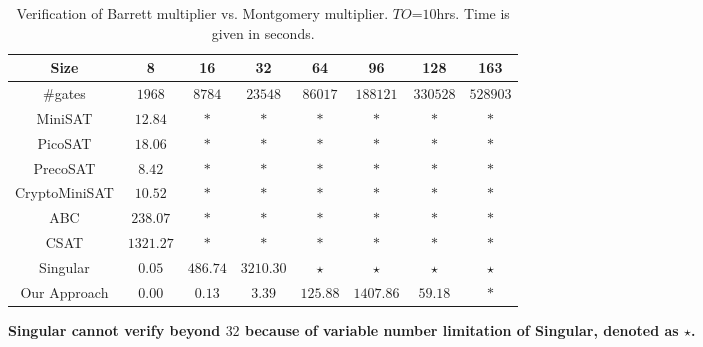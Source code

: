 \begin{table}[h!]
\begin{center}
\caption{\small Verification of Barrett multiplier vs. Montgomery multiplier. $TO$=$10$hrs. Time is given in seconds.}
\label{tab:bvsmont}
\begin{tabular}{|c||c|c|c|c|c|c|c|} \hline 
Size   			&8  		&16       	&32       	&64         &96   		&128		&163	\\
\hline 
\#gates 		&$1968$  	&$8784$    	&$23548$   	&$86017$    &$188121$  	&$330528$	&$528903$\\
\hline
MiniSAT   		&$12.84$  	&$\ast$   	&$\ast$  	&$\ast$    	&$\ast$ 	&$\ast$		&$\ast$ \\
\hline
PicoSAT   		&$18.06$  	&$\ast$   	&$\ast$  	&$\ast$    	&$\ast$ 	&$\ast$		&$\ast$ \\
\hline
PrecoSAT   		&$8.42$  	&$\ast$   	&$\ast$  	&$\ast$    	&$\ast$ 	&$\ast$		&$\ast$ \\
\hline
CryptoMiniSAT	&$10.52$  	&$\ast$   	&$\ast$  	&$\ast$    	&$\ast$ 	&$\ast$		&$\ast$ \\
\hline
ABC   			&$238.07$  	&$\ast$   	&$\ast$  	&$\ast$    	&$\ast$ 	&$\ast$		&$\ast$ \\
\hline
CSAT   			&$1321.27$  &$\ast$   	&$\ast$  	&$\ast$    	&$\ast$  	&$\ast$		&$\ast$ \\
\hline
Singular		&$0.05$  	&$486.74$   &$3210.30$  &$\star$   	&$\star$ 	&$\star$ 	&$\star$	\\
\hline
\hline
Our Approach   	&$0.00$  	&$0.13$   	&$3.39$  	&$125.88$  &$1407.86$  &$59.18$		&$\ast$ \\
\hline
\end{tabular}
\end{center}
\end{table}

{\bf Singular cannot verify beyond $32$  because of variable number limitation of Singular, denoted as $\star$.}

